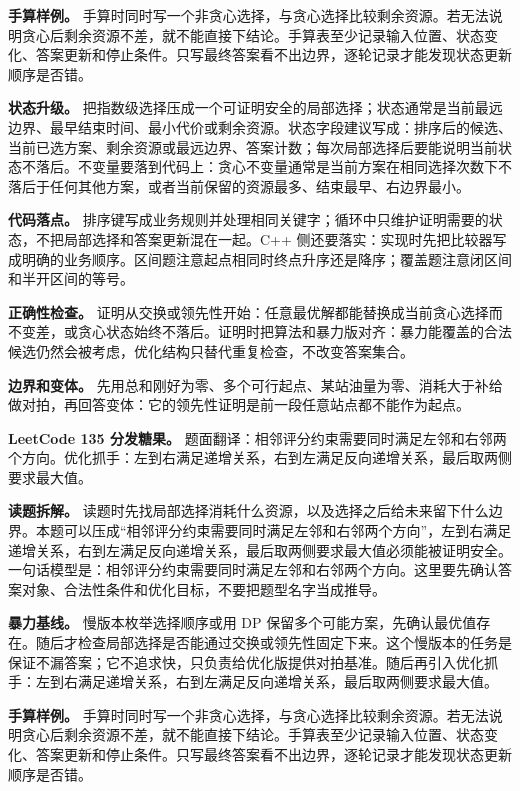 \textbf{手算样例。} 手算时同时写一个非贪心选择，与贪心选择比较剩余资源。若无法说明贪心后剩余资源不差，就不能直接下结论。手算表至少记录输入位置、状态变化、答案更新和停止条件。只写最终答案看不出边界，逐轮记录才能发现状态更新顺序是否错。

\textbf{状态升级。} 把指数级选择压成一个可证明安全的局部选择；状态通常是当前最远边界、最早结束时间、最小代价或剩余资源。状态字段建议写成：排序后的候选、当前已选方案、剩余资源或最远边界、答案计数；每次局部选择后要能说明当前状态不落后。不变量要落到代码上：贪心不变量通常是当前方案在相同选择次数下不落后于任何其他方案，或者当前保留的资源最多、结束最早、右边界最小。

\textbf{代码落点。} 排序键写成业务规则并处理相同关键字；循环中只维护证明需要的状态，不把局部选择和答案更新混在一起。C++ 侧还要落实：实现时先把比较器写成明确的业务顺序。区间题注意起点相同时终点升序还是降序；覆盖题注意闭区间和半开区间的等号。

\textbf{正确性检查。} 证明从交换或领先性开始：任意最优解都能替换成当前贪心选择而不变差，或贪心状态始终不落后。证明时把算法和暴力版对齐：暴力能覆盖的合法候选仍然会被考虑，优化结构只替代重复检查，不改变答案集合。

\textbf{边界和变体。} 先用总和刚好为零、多个可行起点、某站油量为零、消耗大于补给做对拍，再回答变体：它的领先性证明是前一段任意站点都不能作为起点。

\noindent\textbf{LeetCode 135 分发糖果。} 题面翻译：相邻评分约束需要同时满足左邻和右邻两个方向。优化抓手：左到右满足递增关系，右到左满足反向递增关系，最后取两侧要求最大值。

\textbf{读题拆解。} 读题时先找局部选择消耗什么资源，以及选择之后给未来留下什么边界。本题可以压成“相邻评分约束需要同时满足左邻和右邻两个方向”，左到右满足递增关系，右到左满足反向递增关系，最后取两侧要求最大值必须能被证明安全。一句话模型是：相邻评分约束需要同时满足左邻和右邻两个方向。这里要先确认答案对象、合法性条件和优化目标，不要把题型名字当成推导。

\textbf{暴力基线。} 慢版本枚举选择顺序或用 DP 保留多个可能方案，先确认最优值存在。随后才检查局部选择是否能通过交换或领先性固定下来。这个慢版本的任务是保证不漏答案；它不追求快，只负责给优化版提供对拍基准。随后再引入优化抓手：左到右满足递增关系，右到左满足反向递增关系，最后取两侧要求最大值。

\textbf{手算样例。} 手算时同时写一个非贪心选择，与贪心选择比较剩余资源。若无法说明贪心后剩余资源不差，就不能直接下结论。手算表至少记录输入位置、状态变化、答案更新和停止条件。只写最终答案看不出边界，逐轮记录才能发现状态更新顺序是否错。

